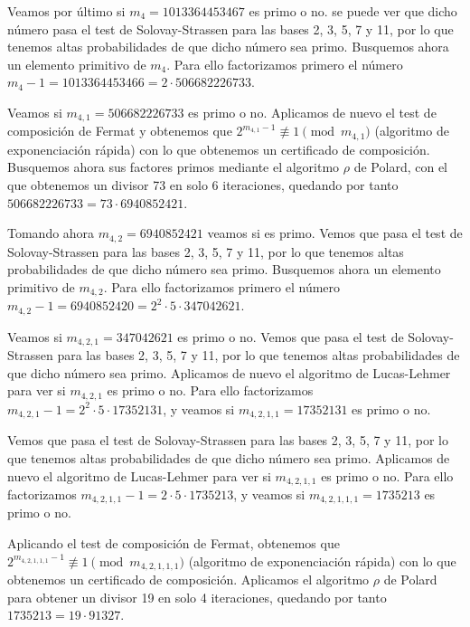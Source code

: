 \documentclass[fleqn]{article}
\begin{document}
    Veamos por último si $m_4 = 1013364453467$ es primo o no. se puede ver que dicho número pasa el test de Solovay-Strassen para las bases
    2, 3, 5, 7 y 11, por lo que tenemos altas probabilidades de que dicho número sea primo. Busquemos ahora un elemento primitivo de $m_4$.
    Para ello factorizamos primero el número $m_4 - 1 = 1013364453466 = 2 \cdot 506682226733$. 
    
    Veamos si $m_{4,1} = 506682226733$ es primo o no.
    Aplicamos de nuevo el test de composición de Fermat y obtenemos que $2^{m_{4,1} -1} \not\equiv 1 \pmod{m_{4,1}}$ (algoritmo de exponenciación rápida) 
    con lo que obtenemos un certificado de composición. Busquemos ahora sus factores primos mediante el algoritmo $\rho$ de Polard, con el que 
    obtenemos un divisor 73 en solo 6 iteraciones, quedando por tanto $506682226733 = 73 \cdot 6940852421$. 
    
    Tomando ahora $m_{4,2} = 6940852421$
    veamos si es primo. Vemos que pasa el test de Solovay-Strassen para las bases 2, 3, 5, 7 y 11, por lo que tenemos altas probabilidades de que dicho número sea primo.
    Busquemos ahora un elemento primitivo de $m_{4,2}$. Para ello factorizamos primero el número $m_{4,2} - 1 = 6940852420 = 2^2 \cdot 5 \cdot 347042621$.
    
    Veamos si $m_{4,2,1} = 347042621$ es primo o no. Vemos que pasa el test de Solovay-Strassen para las bases 2, 3, 5, 7 y 11, por lo que tenemos altas 
    probabilidades de que dicho número sea primo. Aplicamos de nuevo el algoritmo de Lucas-Lehmer para ver si $m_{4,2,1}$ es primo o no. Para ello
    factorizamos $m_{4,2,1} - 1 =  2^2 \cdot 5 \cdot 17352131$, y veamos si $m_{4,2,1,1} = 17352131$ es primo o no. 
    
    Vemos que pasa el test de Solovay-Strassen
    para las bases 2, 3, 5, 7 y 11, por lo que tenemos altas probabilidades de que dicho número sea primo. Aplicamos de nuevo el algoritmo de Lucas-Lehmer
    para ver si $m_{4,2,1,1}$ es primo o no. Para ello factorizamos $m_{4,2,1,1} - 1 =  2 \cdot 5 \cdot 1735213$, y veamos si $m_{4,2,1,1,1} = 1735213$
    es primo o no. 

    Aplicando el test de composición de Fermat, obtenemos que $2^{m_{4,2,1,1,1} -1} \not\equiv 1 \pmod{m_{4,2,1,1,1}}$ (algoritmo de exponenciación rápida)
    con lo que obtenemos un certificado de composición. Aplicamos el algoritmo $\rho$ de Polard para obtener un divisor 19 en solo 4 iteraciones, quedando por tanto
    $1735213 = 19 \cdot 91327$. 
    
\end{document}
